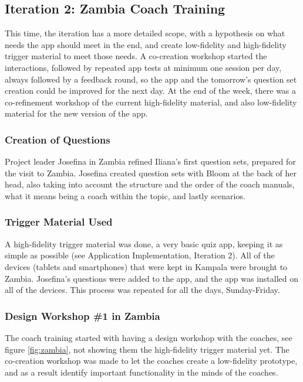 \subsection{Iteration 2: Zambia Coach Training}

This time, the iteration has a more detailed scope, with a hypothesis on what needs the app should meet in the end, and create low-fidelity and high-fidelity trigger material to meet those needs. A co-creation workshop started the interactions, followed by repeated app tests at minimum one session per day, always followed by a feedback round, so the app and the tomorrow's question set creation could be improved for the next day. At the end of the week, there was a co-refinement workshop of the current high-fidelity material, and also low-fidelity material for the new version of the app.

\subsubsection*{Creation of Questions}
Project leader Josefina in Zambia refined Iliana's first question sets, prepared for the visit to Zambia. Josefina created question sets with Bloom at the back of her head, also taking into account the structure and the order of the coach manuals, what it means being a coach within the topic, and lastly scenarios.

\subsubsection{Trigger Material Used}
A high-fidelity trigger material was done, a very basic quiz app, keeping it as simple as possible (see Application Implementation, Iteration 2). All of the devices (tablets and smartphones) that were kept in Kampala were brought to Zambia. Josefina's questions were added to the app, and the app was installed on all of the devices. This process was repeated for all the days, Sunday-Friday.

\subsubsection{Design Workshop \#1 in Zambia}
The coach training started with having a design workshop with the coaches, see figure \ref{fig:zambia}, not showing them the high-fidelity trigger material yet. The co-creation workshop was made to let the coaches create a low-fidelity prototype, and as a result identify important functionality in the minds of the coaches.


